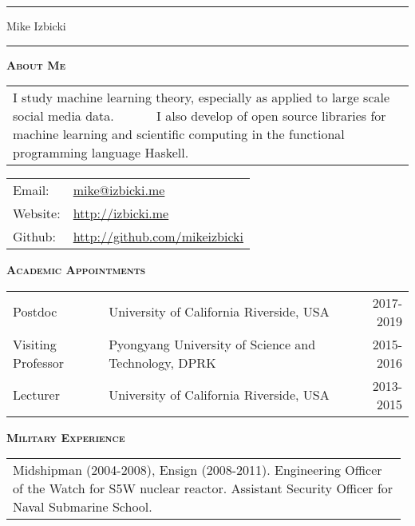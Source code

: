 \documentclass[12pt]{article}
\begin{document}
\noindent\rule{\textwidth}{1pt}
\begin{center}
\LARGE
\vspace{-0.15in}
Mike Izbicki
\end{center}
\vspace{-0.15in}
\noindent\rule{\textwidth}{1pt}
\vspace{0.05in}


\noindent
{{\scshape \bfseries {About Me}}}
\vspace{0.05in}

\noindent
\begin{tabularx}{\textwidth}{X}
    I study machine learning theory, especially as applied to large scale social media data.
    ~~~~~~I also develop of open source libraries for machine learning and scientific computing in the functional programming language Haskell.
\end{tabularx}

\vspace{0.1in}
\noindent
\begin{tabular}{ll}
    Email: & \url{mike@izbicki.me} \\
Website: & \url{http://izbicki.me} \\
Github: & \url{http://github.com/mikeizbicki} \\
\end{tabular}


\vspace{0.15in}
\noindent
{{\scshape \bfseries {Academic Appointments}}}

\noindent
\begin{tabularx}{\textwidth}{lXr}
    Postdoc & University of California Riverside, USA & 2017-2019 \\
    Visiting Professor & Pyongyang University of Science and Technology, DPRK & 2015-2016 \\
    Lecturer & University of California Riverside, USA & 2013-2015 \\
\end{tabularx}

\vspace{0.15in}
\noindent
{{\scshape \bfseries {Military Experience}}}

\noindent
    \begin{tabular}{p{0.98\linewidth}}
    Midshipman (2004-2008), Ensign (2008-2011).  
    Engineering Officer of the Watch for S5W nuclear reactor.
    Assistant Security Officer for Naval Submarine School.
\end{tabular}
\end{document}
